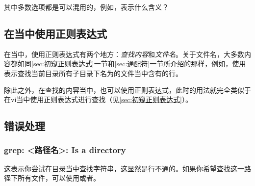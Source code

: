 其中多数选项都是可以混用的，例如，表示什么含义？


\subsection{在当中使用正则表达式}\label{subsec:grep匹配字符串-在grep当中使用正则表达式}

在当中，使用正则表达式有两个地方：\emph{查找内容}和\emph{文件名}。关于文件名，大多数内容都如同\ref{sec:初窥正则表达式}一节和\ref{sec:通配符}一节所介绍的那样，例如，使用表示查找当前目录所有子目录下名为的文件当中含有的行。

除此之外，在查找的内容当中，也可以使用正则表达式，此时的用法就完全类似于在vi当中使用正则表达式进行查找（见\ref{sec:初窥正则表达式}）。


\subsection{错误处理}\label{subsec:grep匹配字符串-错误处理}

\subsubsection{grep: <路径名>: Is a directory}

这表示你尝试在目录当中查找字符串，这显然是行不通的。如果你希望查找这一路径下所有文件，可以使用或者。